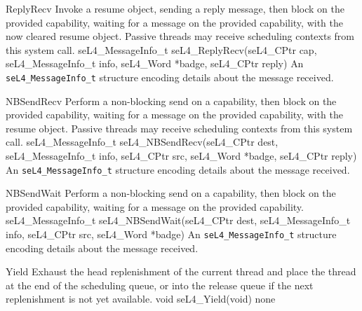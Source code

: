 {ReplyRecv}
{Invoke a resume object, sending a reply message, then block on the provided capability, waiting for
a message on the provided capability, with the now cleared resume object. Passive threads may receive
scheduling contexts from  this system call.}
{seL4_MessageInfo_t seL4_ReplyRecv(seL4_CPtr cap, seL4_MessageInfo_t info, seL4_Word *badge,
seL4_CPtr reply)}
{
}
{An \texttt{seL4_MessageInfo_t} structure encoding details about the message received.}

{NBSendRecv}
{Perform a non-blocking send on a capability, then block on the provided capability, waiting for
a message on the provided capability, with the resume object. Passive threads may receive
scheduling contexts from this system call.}
{seL4_MessageInfo_t seL4_NBSendRecv(seL4_CPtr dest, seL4_MessageInfo_t info, seL4_CPtr src,
    seL4_Word *badge, seL4_CPtr reply)}
{
}
{An \texttt{seL4_MessageInfo_t} structure encoding details about the message received.}

{NBSendWait}
{Perform a non-blocking send on a capability, then block on the provided capability, waiting for
a message on the provided capability.}
{seL4_MessageInfo_t seL4_NBSendWait(seL4_CPtr dest, seL4_MessageInfo_t info, seL4_CPtr src,
    seL4_Word *badge)}
{
}
{An \texttt{seL4_MessageInfo_t} structure encoding details about the message received.}

{Yield}
{Exhaust the head replenishment of the current thread and place the thread at the end of the
scheduling queue, or into the release queue if the next replenishment is not yet available.}
{void seL4_Yield(void)}
{}
{none}


